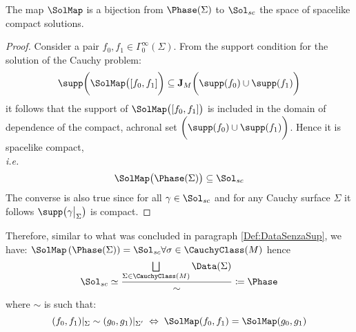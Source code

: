 \documentclass[Main]{subfiles}
\begin{document}
			\begin{proposition}
				The map $\SolMap$ is a bijection from $\Phase(\Sigma)$ to $\Sol_{sc}$ the space of spacelike compact solutions.			
			\end{proposition}
			\begin{proof}
				Consider a pair $f_0, f_1 \in \Gamma_0^\infty(\Sigma)$. From the support condition for the solution of the Cauchy problem:
				\begin{equation}\label{Eq:SupportoCauchySol}
					\supp\biggr( \SolMap \big([f_0,f_1] \biggr) \subseteq \mathbf{J}_M \biggr( \supp(f_0) \cup \supp(f_1) \biggr)
				\end{equation}
				it follows that the support of $\SolMap \big([f_0,f_1]\big) $	is included in the domain of dependence of the compact, achronal	set $\biggr( \supp(f_0) \cup \supp(f_1) \biggr)$.
				Hence it is spacelike compact,\\ \textit{i.e.}
				\begin{displaymath}
					\SolMap \big( \Phase(\Sigma)\big) \subseteq \Sol_{sc}
				\end{displaymath}
				The converse is also true since for all $\gamma \in \Sol_{sc}$ and for any Cauchy surface $\Sigma$ it follows $\supp\big( \gamma \big\vert_\Sigma \big)$ is compact.
			\end{proof}
			Therefore, similar to what was concluded in paragraph  \ref{Def:DataSenzaSup}, we have:
			$ \SolMap \left( \Phase(\Sigma) \right) = \Sol_{sc} \forall \sigma \in \CauchyClass(M)$
			hence
			\begin{equation}
				\Sol_{sc} \simeq \frac{\bigsqcup\limits_{\Sigma \in \CauchyClass(M)}\Data(\Sigma)}{\sim} \coloneqq \Phase
			\end{equation}
				where $\sim$ is such that:
				\begin{displaymath}
					(f_0, f_1)|_\Sigma \sim (g_0, g_1)|_{\Sigma'} \; \Leftrightarrow \; \SolMap(f_0,f_1) =  \SolMap(g_0,g_1) 
				\end{displaymath}
\end{document}

